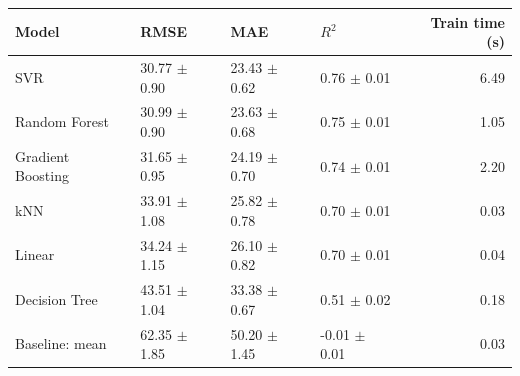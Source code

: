 \begin{tabular}{llllr}
\toprule
Model & RMSE & MAE & $R^2$ & Train time (s) \\
\midrule
SVR & 30.77 $\pm$ 0.90 & 23.43 $\pm$ 0.62 & 0.76 $\pm$ 0.01 & 6.49 \\
Random Forest & 30.99 $\pm$ 0.90 & 23.63 $\pm$ 0.68 & 0.75 $\pm$ 0.01 & 1.05 \\
Gradient Boosting & 31.65 $\pm$ 0.95 & 24.19 $\pm$ 0.70 & 0.74 $\pm$ 0.01 & 2.20 \\
kNN & 33.91 $\pm$ 1.08 & 25.82 $\pm$ 0.78 & 0.70 $\pm$ 0.01 & 0.03 \\
Linear & 34.24 $\pm$ 1.15 & 26.10 $\pm$ 0.82 & 0.70 $\pm$ 0.01 & 0.04 \\
Decision Tree & 43.51 $\pm$ 1.04 & 33.38 $\pm$ 0.67 & 0.51 $\pm$ 0.02 & 0.18 \\
Baseline: mean & 62.35 $\pm$ 1.85 & 50.20 $\pm$ 1.45 & -0.01 $\pm$ 0.01 & 0.03 \\
\bottomrule
\end{tabular}
